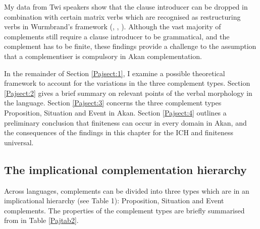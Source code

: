 \documentclass[output=paper]{langscibook}
\begin{document}
My data from Twi speakers show that the clause introducer can be dropped in combination with certain matrix verbs which are recognised as restructuring verbs in Wurmbrand’s framework (\citeyear{wurmbrand2001}, \citeyear{todorovic2015}, \citeyear{wurmbrandetal2020}). Although the vast majority of complements still require a clause introducer to be grammatical, and the complement has to be finite, these findings provide a challenge to the assumption that a complementiser is compulsory in Akan complementation. 

In the remainder of Section \ref{Pajsect:1}, I examine a possible theoretical framework to account for the variations in the three complement types. Section \ref{Pajsect:2} gives a brief summary on relevant points of the verbal morphology in the language. Section \ref{Pajsect:3} concerns the three complement types Proposition, Situation and Event in Akan. Section \ref{Pajsect:4} outlines a preliminary conclusion that finiteness can occur in every domain in Akan, and the consequences of the findings in this chapter for the ICH and finiteness universal. 

\subsection{The implicational complementation hierarchy}
\label{Paj1.2}

Across languages, complements can be divided into three types which are in an implicational hierarchy (see Table 1): Proposition, Situation and Event complements. The properties of the complement types are briefly summarised from \citet{wurmbrandlohninger2020} in Table \ref{Pajtab2}. 

\end{document}
